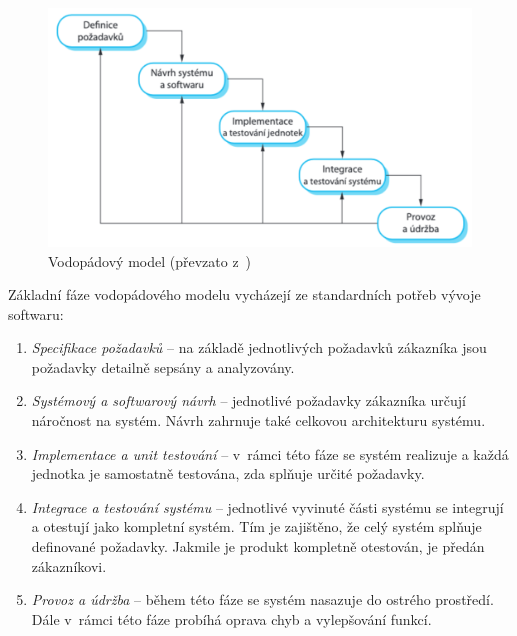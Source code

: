 \documentclass[czech,master]{diploma}
\begin{document}
\begin{figure}[!ht]
    \centering
    \includegraphics[width=1\textwidth]{Diplomka/Figures/waterfall.png}
    \caption{Vodopádový model (převzato z~\cite{ref:sommerrville_waterfall})}
    \label{fig:waterfall}
\end{figure}

Základní fáze vodopádového modelu vycházejí ze standardních potřeb vývoje softwaru:

\begin{enumerate}
\item \textit{Specifikace požadavků} -- na základě jednotlivých požadavků zákazníka jsou požadavky detailně sepsány a analyzovány.

\item \textit{Systémový a softwarový návrh} -- jednotlivé požadavky zákazníka určují náročnost na systém. Návrh zahrnuje také celkovou architekturu systému.

\item \textit{Implementace a unit testování} -- v~rámci této fáze se systém realizuje a každá jednotka je samostatně testována, zda splňuje určité požadavky.

\item \textit{Integrace a testování systému} -- jednotlivé vyvinuté části systému se integrují a otestují jako kompletní systém. Tím je zajištěno, že celý systém splňuje definované požadavky. Jakmile je produkt kompletně otestován, je předán zákazníkovi.

\item \textit{Provoz a údržba} -- během této fáze se systém nasazuje do ostrého prostředí. Dále v~rámci této fáze probíhá oprava chyb a vylepšování funkcí.

\end{enumerate}
\end{document}
